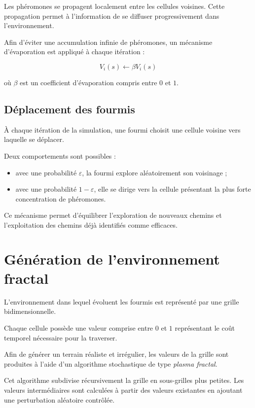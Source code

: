 \documentclass[11pt]{article}
\begin{document}
Les phéromones se propagent localement entre les cellules voisines. Cette propagation permet à l'information de se diffuser progressivement dans l'environnement.

Afin d'éviter une accumulation infinie de phéromones, un mécanisme d'évaporation est appliqué à chaque itération :

\[
V_i(s) \leftarrow \beta V_i(s)
\]

où $\beta$ est un coefficient d'évaporation compris entre $0$ et $1$.

\subsection{Déplacement des fourmis}

À chaque itération de la simulation, une fourmi choisit une cellule voisine vers laquelle se déplacer.

Deux comportements sont possibles :

\begin{itemize}

\item avec une probabilité $\varepsilon$, la fourmi explore aléatoirement son voisinage ;
\item avec une probabilité $1-\varepsilon$, elle se dirige vers la cellule présentant la plus forte concentration de phéromones.
\end{itemize}

Ce mécanisme permet d'équilibrer l'exploration de nouveaux chemins et l'exploitation des chemins déjà identifiés comme efficaces.

\section{Génération de l'environnement fractal}

L'environnement dans lequel évoluent les fourmis est représenté par une grille bidimensionnelle.

Chaque cellule possède une valeur comprise entre $0$ et $1$ représentant le coût temporel nécessaire pour la traverser.

Afin de générer un terrain réaliste et irrégulier, les valeurs de la grille sont produites à l'aide d'un algorithme stochastique de type \textit{plasma fractal}.

Cet algorithme subdivise récursivement la grille en sous-grilles plus petites. Les valeurs intermédiaires sont calculées à partir des valeurs existantes en ajoutant une perturbation aléatoire contrôlée.
\end{document}
